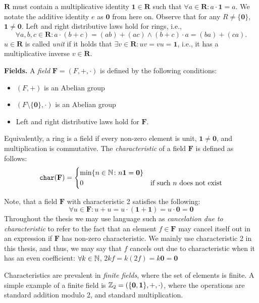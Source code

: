 $\mathbf{R}$ must contain a multiplicative identity 
$\mathbf{1} \in \mathbf{R}$ such that $\forall a \in \mathbf{R} \colon a \cdot \mathbf{1} = a$. 
We notate the additive identity $e$ 
as $\mathbf{0}$ from here on. 
Observe that for any $R \neq \{\mathbf{0}\}$, $\mathbf{1} \neq \mathbf{0}$. 
Left and right distributive laws hold for rings, i.e., 
\[
  \forall a, b, c \in \mathbf{R} \colon a \cdot (b + c) = (ab) + (ac) \land (b + c) \cdot a = (ba) + (ca).
\]
$u \in \mathbf{R}$ is called \emph{unit} if it holds 
that $\exists v \in \mathbf{R} \colon uv = vu = \mathbf{1}$, 
i.e., it has a multiplicative inverse $v \in \mathbf{R}$.

\textbf{Fields.} A \emph{field} $\mathbf{F} = (F, +, \cdot)$ is defined by the following conditions:
\begin{itemize}
  \item $(F, +)$ is an Abelian group
  \item $(F\setminus \{\mathbf{0}\}, \cdot )$ is an Abelian group
  \item Left and right distributive laws hold for $\mathbf{F}$.
\end{itemize}

Equivalently, a ring is a field if every non-zero element is unit, $\mathbf{1} \neq \mathbf{0}$, 
and multiplication is commutative. 
The \emph{characteristic} of a field $\mathbf{F}$ is defined as follows:
\begin{equation}
  \texttt{char}(\mathbf{F}) =
    \begin{cases}
      \min\{n \in \mathbb N \colon n\mathbf{1} = \mathbf{0} \}\\
      0 & \text{if such $n$ does not exist}\\
    \end{cases}       
\end{equation}

Note, that a field $\mathbf{F}$ with 
characteristic 2 satisfies the following:
\[
  \forall u \in \mathbf{F} \colon u + u = u \cdot (\mathbf 1 + \mathbf 1) = u \cdot \mathbf 0 = \mathbf 0
\]
Throughout the thesis we may use language such as \emph{cancelation due to characteristic} to 
refer to the fact that an element $f \in \mathbf{F}$ may cancel itself out in an expression if 
$\mathbf{F}$ has non-zero characteristic. 
We mainly use characteristic 2 in this thesis, and thus, we may say that 
$f$ cancels out due to characteristic when 
it has an even coefficient: $\forall k \in \mathbb N$, $2kf = k(2f) = k\mathbf{0}=\mathbf{0}$

Characteristics are prevalent in \emph{finite fields}, where the set of elements is finite. 
A simple example of a finite field is $\mathbb Z_2 = (\{\mathbf{0}, \mathbf{1}\}, +, \cdot)$, where 
the operations are standard addition modulo 2, and standard multiplication. 

